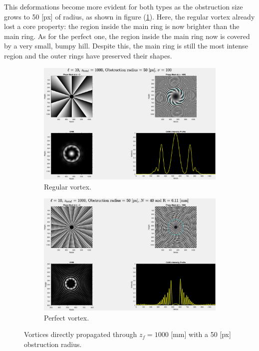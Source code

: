 This deformations become more evident for both types as the obstruction size grows to 50 [px] of radius, as shown in figure (\ref{fig:Vortices_r=50_z=1000}). Here, the regular vortex already lost a core property: the region inside the main ring is now brighter than the main ring. As for the perfect one, the region inside the main ring now is covered by a very small, bumpy hill. Despite this, the main ring is still the most intense region and the outer rings have preserved their shapes.

\begin{figure}[htbp]
    \centering
    \begin{subfigure}[b]{0.45\textwidth}
        \centering
        \includegraphics[width=\textwidth]{images/c04/type=0_r=50_zi=0_zf=1000.eps}
        \caption{Regular vortex.}
    \end{subfigure}
    \hfill
    \begin{subfigure}[b]{0.45\textwidth}
        \centering
        \includegraphics[width=\textwidth]{images/c04/type=1_r=50_zi=0_zf=1000.eps}
        \caption{Perfect vortex.}
    \end{subfigure}
    \caption{Vortices directly propagated through $z_f = 1000$ [mm] with a 50 [px] obstruction radius.}
    \label{fig:Vortices_r=50_z=1000}
\end{figure}

